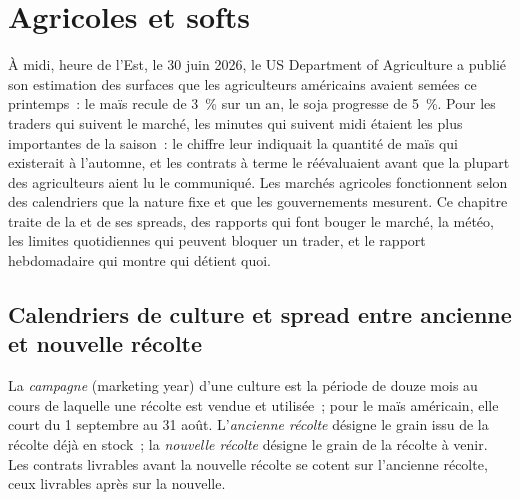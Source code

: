 \chapter{Agricoles et softs}\label{ch:m3:agriculturals-and-softs}

À midi, heure de l'Est, le 30 juin 2026, le US Department of Agriculture a publié son estimation des
surfaces que les agriculteurs américains avaient semées ce printemps~: le maïs recule de 3~\% sur un an, le soja progresse de 5~\%.
Pour les traders qui suivent le marché, les minutes qui suivent midi étaient les plus importantes de la saison~: le
chiffre leur indiquait la quantité de maïs qui existerait à l'automne, et les contrats à terme le réévaluaient avant que la plupart
des agriculteurs aient lu le communiqué. Les marchés agricoles fonctionnent selon des calendriers que la nature fixe et
que les gouvernements mesurent. Ce chapitre traite de la  et de ses spreads, des rapports qui font bouger le
marché, la météo, les limites quotidiennes qui peuvent bloquer un trader, et le rapport hebdomadaire qui montre
qui détient quoi.

\section{Calendriers de culture et spread entre ancienne et nouvelle récolte}

\begin{definition}\label{def:m3:agriculturals-and-softs:cropyear}
La \emph{campagne} (marketing year) d'une culture est la période de douze mois
au cours de laquelle une récolte est vendue et utilisée~; pour le maïs américain, elle court du 1 septembre au 31 août.
L'\emph{ancienne récolte} désigne le grain issu de la récolte déjà en stock~; la \emph{nouvelle
récolte} désigne le grain de la récolte à venir. Les contrats livrables avant la nouvelle récolte
se cotent sur l'ancienne récolte, ceux livrables après sur la nouvelle.
\end{definition}

